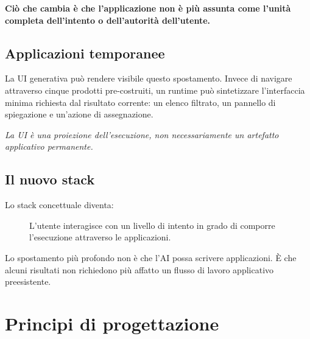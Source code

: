 \documentclass[10pt,oneside,openany]{book}
\newcommand{\keyidea}[1]{%
  \vspace{3pt}
  \noindent\fbox{\begin{minipage}{0.94\linewidth}\small\raggedright\textbf{Idea chiave.} #1\end{minipage}}
  \vspace{3pt}
}
\renewcommand{\keyidea}[1]{\begin{keyideabox}#1\end{keyideabox}}
\begin{document}
\textbf{Ciò che cambia è che l'applicazione non è più assunta come l'unità completa dell'intento o dell'autorità dell'utente.}

\section{Applicazioni temporanee}
La UI generativa può rendere visibile questo spostamento. Invece di navigare attraverso cinque prodotti pre-costruiti, un runtime può sintetizzare l'interfaccia minima richiesta dal risultato corrente: un elenco filtrato, un pannello di spiegazione e un'azione di assegnazione.

\emph{La UI è una proiezione dell'esecuzione, non necessariamente un artefatto applicativo permanente.}

\section{Il nuovo stack}
Lo stack concettuale diventa:

\begin{figure}[ht]
\centering
{}
\caption{L'utente interagisce con un livello di intento in grado di comporre l'esecuzione attraverso le applicazioni.}
\end{figure}

\keyidea{Lo spostamento più profondo non è che l'AI possa scrivere applicazioni. È che alcuni risultati non richiedono più affatto un flusso di lavoro applicativo preesistente.}

\chapter{Principi di progettazione}
\end{document}
